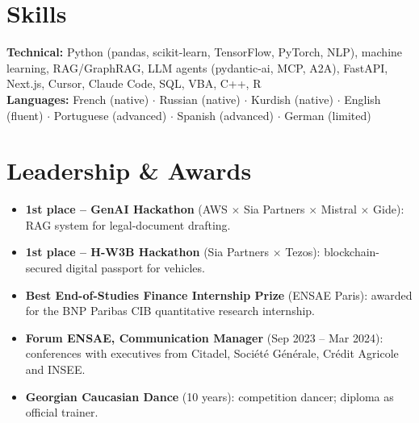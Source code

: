 \documentclass[10.3pt]{article}
\begin{document}
\section*{Skills}
\textbf{Technical:} Python (pandas, scikit-learn, TensorFlow, PyTorch, NLP), machine learning, RAG/GraphRAG, LLM agents (pydantic-ai, MCP, A2A), FastAPI, Next.js, Cursor, Claude Code, SQL, VBA, C++, R\\
\textbf{Languages:} French (native) \(\cdot\) Russian (native) \(\cdot\) Kurdish (native) \(\cdot\) English (fluent) \(\cdot\) Portuguese (advanced) \(\cdot\) Spanish (advanced) \(\cdot\) German (limited)

\section*{Leadership \& Awards}
\begin{itemize}
  \item \textbf{1st place -- GenAI Hackathon} (AWS \(\times\) Sia Partners \(\times\) Mistral \(\times\) Gide): RAG system for legal-document drafting.
  \item \textbf{1st place -- H-W3B Hackathon} (Sia Partners \(\times\) Tezos): blockchain-secured digital passport for vehicles.
  \item \textbf{Best End-of-Studies Finance Internship Prize} (ENSAE Paris): awarded for the BNP Paribas CIB quantitative research internship.
  \item \textbf{Forum ENSAE, Communication Manager} (Sep 2023 -- Mar 2024): conferences with executives from Citadel, Soci\'et\'e G\'en\'erale, Cr\'edit Agricole and INSEE.
  \item \textbf{Georgian Caucasian Dance} (10 years): competition dancer; diploma as official trainer.
\end{itemize}
\end{document}
